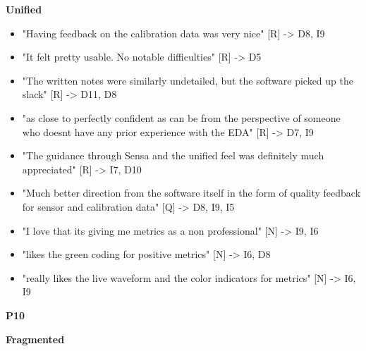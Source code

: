 \documentclass[
]{article}
\begin{document}
\textbf{Unified}

\begin{itemize}
\item
  "Having feedback on the calibration data was very nice" {[}R{]} -\textgreater{} D8, I9
\item
  "It felt pretty usable. No notable difficulties" {[}R{]} -\textgreater{} D5
\item
  "The written notes were similarly undetailed, but the software picked up the slack" {[}R{]} -\textgreater{} D11, D8
\item
  "as close to perfectly confident as can be from the perspective of someone who doesn\textquotesingle t have any prior experience with the EDA" {[}R{]} -\textgreater{} D7, I9
\item
  "The guidance through Sensa and the unified feel was definitely much appreciated" {[}R{]} -\textgreater{} I7, D10
\item
  "Much better direction from the software itself in the form of quality feedback for sensor and calibration data" {[}Q{]} -\textgreater{} D8, I9, I5
\item
  "I love that it\textquotesingle s giving me metrics as a non professional" {[}N{]} -\textgreater{} I9, I6
\item
  "likes the green coding for positive metrics" {[}N{]} -\textgreater{} I6, D8
\item
  "really likes the live waveform and the color indicators for metrics" {[}N{]} -\textgreater{} I6, I9
\end{itemize}

\textbf{P10}

\textbf{Fragmented}
\end{document}
